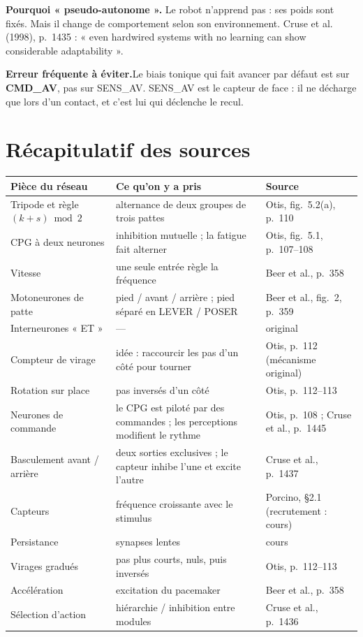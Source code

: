 \documentclass[11pt]{article}
\newcommand{\champ}[2]{\par\noindent\textbf{\color{bleu}#1} #2\par}
\newcommand{\attention}[2]{\par\noindent\colorbox{fondbloc}{\parbox{\dimexpr\linewidth-2\fboxsep}{%
  \textbf{\color{alerte}#1}\quad #2}}\par}
\begin{document}
\champ{Pourquoi « pseudo-autonome ».}{Le robot n'apprend pas : ses poids sont fixés. Mais il change
de comportement selon son environnement. Cruse et al. (1998), p.~1435 \cite{cruse1998} : « even
hardwired systems with no learning can show considerable adaptability ».}

\attention{Erreur fréquente à éviter.}{Le biais tonique qui fait avancer par défaut est sur
\textbf{CMD\_AV}, pas sur SENS\_AV. SENS\_AV est le capteur de face : il ne décharge que lors d'un
contact, et c'est lui qui déclenche le recul.}

\section*{Récapitulatif des sources}

\begin{center}
\small
\begin{tabularx}{\linewidth}{l >{\raggedright\arraybackslash}X l}
  \toprule
  \textbf{Pièce du réseau} & \textbf{Ce qu'on y a pris} & \textbf{Source}\\ \midrule
  Tripode et règle $(k + s) \bmod 2$ & alternance de deux groupes de trois pattes & Otis, fig.~5.2(a), p.~110\\
  CPG à deux neurones & inhibition mutuelle ; la fatigue fait alterner & Otis, fig.~5.1, p.~107--108\\
  Vitesse & une seule entrée règle la fréquence & Beer et al., p.~358\\
  Motoneurones de patte & pied / avant / arrière ; pied séparé en LEVER / POSER & Beer et al., fig.~2, p.~359\\
  Interneurones « ET » & --- & original\\
  Compteur de virage & idée : raccourcir les pas d'un côté pour tourner & Otis, p.~112 (mécanisme original)\\
  Rotation sur place & pas inversés d'un côté & Otis, p.~112--113\\ \midrule
  Neurones de commande & le CPG est piloté par des commandes ; les perceptions modifient le rythme & Otis, p.~108 ; Cruse et al., p.~1445\\
  Basculement avant / arrière & deux sorties exclusives ; le capteur inhibe l'une et excite l'autre & Cruse et al., p.~1437\\
  Capteurs & fréquence croissante avec le stimulus & Porcino, §2.1 (recrutement : cours)\\
  Persistance & synapses lentes & cours\\
  Virages gradués & pas plus courts, nuls, puis inversés & Otis, p.~112--113\\
  Accélération & excitation du pacemaker & Beer et al., p.~358\\
  Sélection d'action & hiérarchie / inhibition entre modules & Cruse et al., p.~1436\\ \bottomrule
\end{tabularx}
\end{center}



\end{document}
